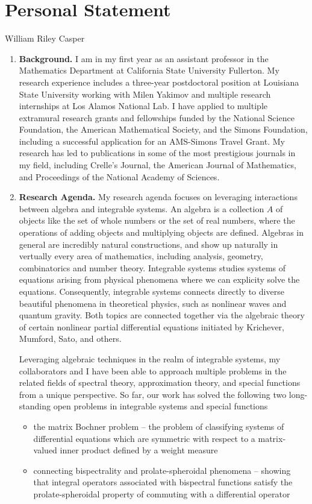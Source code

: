 \documentclass[11pt,letterpaper]{article}
\newcommand{\required}[1]{\section*{\hfil #1\hfil}}                    %
\theoremstyle{definition}
\begin{document}
\required{Personal Statement}
\begin{center}
William Riley Casper
\end{center}


\begin{enumerate}[]
\item{\textbf{Background.}}
I am in my first year as an assistant professor in the Mathematics Department at California State University Fullerton.
My research experience includes a three-year postdoctoral position at Louisiana State University working with Milen Yakimov and multiple research internships at Los Alamos National Lab.
I have applied to multiple extramural research grants and fellowships funded by the National Science Foundation, the American Mathematical Society, and the Simons Foundation, including a successful application for an AMS-Simons Travel Grant.
My research has led to publications in some of the most prestigious journals in my field, including Crelle's Journal, the American Journal of Mathematics, and Proceedings of the National Academy of Sciences.

\item{\textbf{Research Agenda.}}
My research agenda focuses on leveraging interactions between algebra and integrable systems.
An algebra is a collection $A$ of objects like the set of whole numbers or the set of real numbers, where the operations of adding objects and multiplying objects are defined.
Algebras in general are incredibly natural constructions, and show up naturally in vertually every area of mathematics, including analysis, geometry, combinatorics and number theory.
Integrable systems studies systems of equations arising from physical phenomena where we can explicity solve the equations.
Consequently, integrable systems connects directly to diverse beautiful phenomena in theoretical physics, such as nonlinear waves and quantum gravity.
Both topics are connected together via the algebraic theory of certain nonlinear partial differential equations initiated by Krichever, Mumford, Sato, and others.

Leveraging algebraic techniques in the realm of integrable systems, my collaborators and I have been able to approach multiple problems in the related fields of spectral theory, approximation theory, and special functions from a unique perspective.
So far, our work has solved the following two long-standing open problems in integrable systems and special functions
\begin{itemize}
\item the matrix Bochner problem -- the problem of classifying systems of differential equations which are symmetric with respect to a matrix-valued inner product defined by a weight measure
\item connecting bispectrality and prolate-spheroidal phenomena -- showing that integral operators associated with bispectral functions satisfy the prolate-spheroidal property of commuting with a differential operator
\end{itemize}

\end{enumerate}
\end{document}
